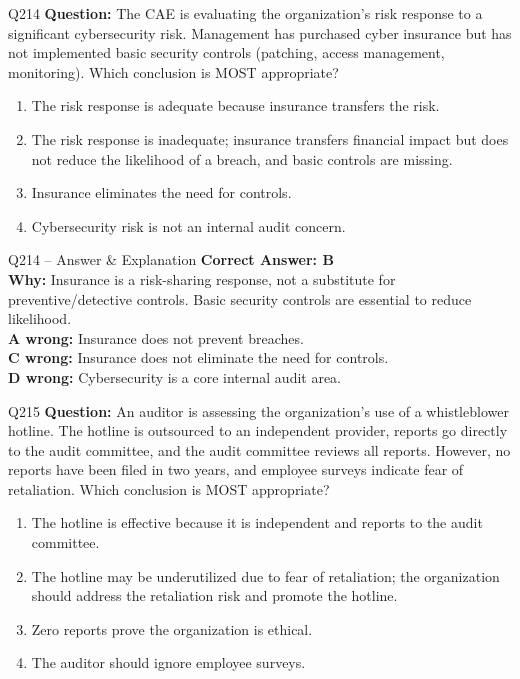 \documentclass[aspectratio=169,10pt]{beamer}
\begin{document}
	\begin{frame}[t]{Q214}
		\small
		\textbf{Question:} The CAE is evaluating the organization's risk response to a significant cybersecurity risk. Management has purchased cyber insurance but has not implemented basic security controls (patching, access management, monitoring). Which conclusion is MOST appropriate?
		\begin{enumerate}[label=\Alph*.,itemsep=1pt,topsep=2pt]
			\item The risk response is adequate because insurance transfers the risk.
			\item The risk response is inadequate; insurance transfers financial impact but does not reduce the likelihood of a breach, and basic controls are missing.
			\item Insurance eliminates the need for controls.
			\item Cybersecurity risk is not an internal audit concern.
		\end{enumerate}
	\end{frame}
	
	\begin{frame}[t]{Q214 -- Answer \& Explanation}
		\small
		\textbf{Correct Answer: B} \\[4pt]
		\textbf{Why:} Insurance is a risk-sharing response, not a substitute for preventive/detective controls. Basic security controls are essential to reduce likelihood. \\[4pt]
		\textbf{A wrong:} Insurance does not prevent breaches. \\[2pt]
		\textbf{C wrong:} Insurance does not eliminate the need for controls. \\[2pt]
		\textbf{D wrong:} Cybersecurity is a core internal audit area.
	\end{frame}
	
	\begin{frame}[t]{Q215}
		\small
		\textbf{Question:} An auditor is assessing the organization's use of a whistleblower hotline. The hotline is outsourced to an independent provider, reports go directly to the audit committee, and the audit committee reviews all reports. However, no reports have been filed in two years, and employee surveys indicate fear of retaliation. Which conclusion is MOST appropriate?
		\begin{enumerate}[label=\Alph*.,itemsep=1pt,topsep=2pt]
			\item The hotline is effective because it is independent and reports to the audit committee.
			\item The hotline may be underutilized due to fear of retaliation; the organization should address the retaliation risk and promote the hotline.
			\item Zero reports prove the organization is ethical.
			\item The auditor should ignore employee surveys.
		\end{enumerate}
	\end{frame}
	
\end{document}
